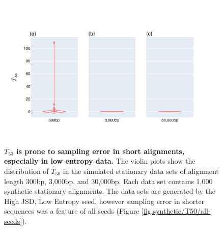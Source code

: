 \begin{figure}[htbp]
\centering
\includegraphics[width=\textwidth]{figures/plots/synthetic/T50/HighJSDLowEntropy-seq_len.pdf}
\caption[$T_{50}$ was prone to sampling error in short alignments, especially in low entropy data]{\textbf{$T_{50}$ is prone to sampling error in short alignments, especially in low entropy data.} The violin plots show the distribution of $\hat T_{50}$ in the simulated stationary data sets of alignment length 300bp, 3,000bp, and 30,000bp. Each data set contains 1,000 synthetic stationary alignments. The data sets are generated by the High JSD, Low Entropy seed, however sampling error in shorter sequences was a feature of all seeds (Figure \ref{fig:synthetic/T50/all-seeds}). }
\label{fig:T50-short_long}
\end{figure}